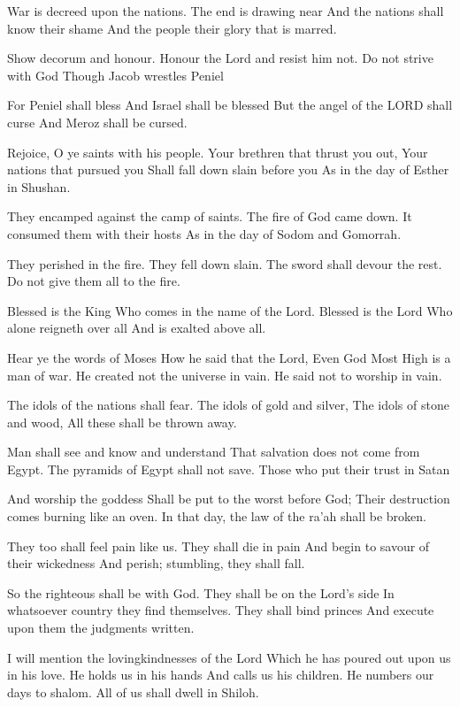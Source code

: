 \documentclass[
]{book}
\begin{document}
War is decreed upon the nations.
The end is drawing near
And the nations shall know their shame
And the people their glory that is marred.

Show decorum and honour.
Honour the Lord and resist him not.
Do not strive with God
Though Jacob wrestles Peniel

For Peniel shall bless
And Israel shall be blessed
But the angel of the LORD shall curse
And Meroz shall be cursed.

Rejoice, O ye saints with his people.
Your brethren that thrust you out,
Your nations that pursued you
Shall fall down slain before you
As in the day of Esther in Shushan.

They encamped against the camp of saints.
The fire of God came down.
It consumed them with their hosts
As in the day of Sodom and Gomorrah.

They perished in the fire.
They fell down slain.
The sword shall devour the rest.
Do not give them all to the fire.

Blessed is the King
Who comes in the name of the Lord.
Blessed is the Lord
Who alone reigneth over all
And is exalted above all.

Hear ye the words of Moses
How he said that the Lord,
Even God Most High is a man of war.
He created not the universe in vain.
He said not to worship in vain.

The idols of the nations shall fear.
The idols of gold and silver,
The idols of stone and wood,
All these shall be thrown away.

Man shall see and know and understand
That salvation does not come from Egypt.
The pyramids of Egypt shall not save.
Those who put their trust in Satan

And worship the goddess
Shall be put to the worst before God;
Their destruction comes burning like an oven.
In that day, the law of the ra'ah shall be broken.

They too shall feel pain like us.
They shall die in pain
And begin to savour of their wickedness
And perish; stumbling, they shall fall.

So the righteous shall be with God.
They shall be on the Lord's side
In whatsoever country they find themselves.
They shall bind princes
And execute upon them the judgments written.

I will mention the lovingkindnesses of the Lord
Which he has poured out upon us in his love.
He holds us in his hands
And calls us his children.
He numbers our days to shalom.
All of us shall dwell in Shiloh.
\end{document}
